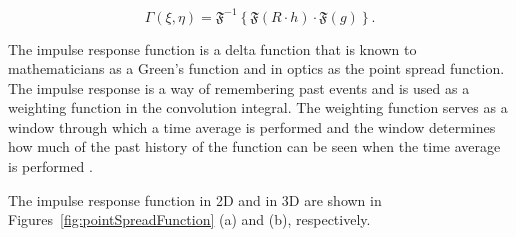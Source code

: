     \begin{equation}
        \Gamma(\xi,\eta) = \mathfrak{F}^{-1}\left\{ \mathfrak{F}(R\cdot h)
        \cdot\mathfrak{F}(g) \right\} .
        \label{eq:convReconstruction}
    \end{equation}

    The impulse response function is a delta function that is known to
    mathematicians as a Green's function
    and in optics as the point spread function. The impulse response is
    a way of remembering past events and is used as a weighting function in the
    convolution integral. The weighting function serves as a window through which a
    time average is performed and the window determines how much of the past history
    of the function can be seen when the time average is performed
    \cite{guenther_modern_1990}.

    The impulse response function in 2D and in 3D are shown in
    Figures~\ref{fig:pointSpreadFunction} (a) and (b), respectively.

%

